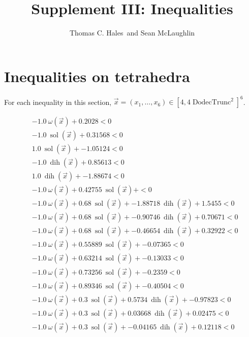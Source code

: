 \documentclass{article} %
\DeclareMathOperator{\sol}{sol}
\DeclareMathOperator{\dih}{dih}
\DeclareMathOperator{\trunc}{DodecTrunc}
\newcommand{\vx}{\vec{x}}
\begin{document}
\title{Supplement III: Inequalities}
\author{Thomas C. Hales\ and Sean McLaughlin}
\date{}
\maketitle

\section*{Inequalities on tetrahedra}

For each inequality in this section, $\vx = (x_1,\ldots,x_6)\in[4,4\trunc^2]^6$.

\allowdisplaybreaks

\begin{align*}
&-1.0\ \omega(\vx) + 0.2028 < 0 \tag{D\_232427898} \\
&-1.0\ \sol(\vx) + 0.31568 < 0 \tag{D\_501745932} \\
&1.0\ \sol(\vx) + -1.05124 < 0 \tag{D\_454413312} \\
&-1.0\ \dih(\vx) + 0.85613 < 0 \tag{D\_484548925} \\
&1.0\ \dih(\vx) + -1.88674 < 0 \tag{D\_140432082} \\
&-1.0\ \omega(\vx) + 0.42755\ \sol(\vx) +  < 0 \tag{D\_211431164} \\
&-1.0\ \omega(\vx) + 0.68\ \sol(\vx) + -1.88718\ \dih(\vx) + 1.5455 < 0 \tag{D\_120383233} \\
&-1.0\ \omega(\vx) + 0.68\ \sol(\vx) + -0.90746\ \dih(\vx) + 0.70671 < 0 \tag{D\_950195574} \\
&-1.0\ \omega(\vx) + 0.68\ \sol(\vx) + -0.46654\ \dih(\vx) + 0.32922 < 0 \tag{D\_411439162} \\
&-1.0\ \omega(\vx) + 0.55889\ \sol(\vx) + -0.07365 < 0 \tag{D\_930476095} \\
&-1.0\ \omega(\vx) + 0.63214\ \sol(\vx) + -0.13033 < 0 \tag{D\_504216105} \\
&-1.0\ \omega(\vx) + 0.73256\ \sol(\vx) + -0.2359 < 0 \tag{D\_303447655} \\
&-1.0\ \omega(\vx) + 0.89346\ \sol(\vx) + -0.40504 < 0 \tag{D\_999530305} \\
&-1.0\ \omega(\vx) + 0.3\ \sol(\vx) + 0.5734\ \dih(\vx) + -0.97823 < 0 \tag{D\_774222998} \\
&-1.0\ \omega(\vx) + 0.3\ \sol(\vx) + 0.03668\ \dih(\vx) + 0.02475 < 0 \tag{D\_583790155} \\
&-1.0\ \omega(\vx) + 0.3\ \sol(\vx) + -0.04165\ \dih(\vx) + 0.12118 < 0 \tag{D\_954638763} \\

\end{align*}
\end{document}
